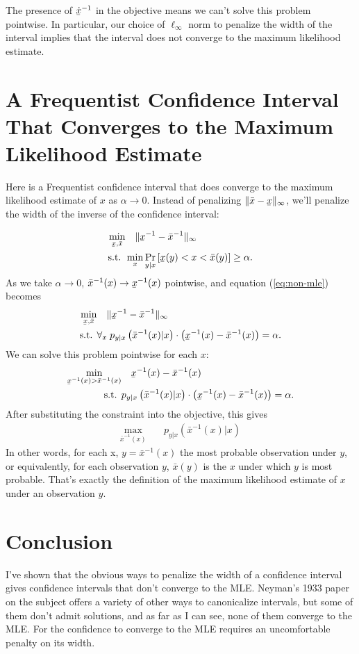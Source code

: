 \documentclass{article}
\newcommand{\xl}{\underaccent{\bar}{x}}
\newcommand{\xh}{\bar{x}}
\newcommand{\xli}{\xl^{-1}}
\newcommand{\xhi}{\xh^{-1}}
\newcommand{\1}{\mathbf{1}}
\begin{document}
The presence of $\dot{\xl}^{-1}$ in the objective means we can't solve this
problem pointwise. In particular, our choice of $\ell_\infty$ norm to penalize
the width of the interval implies that the interval does not converge to the
maximum likelihood estimate.

\section{A Frequentist Confidence Interval That Converges to the Maximum Likelihood Estimate}

Here is a Frequentist confidence interval that does converge to the maximum
likelihood estimate of $x$ as $\alpha\to 0$. Instead of penalizing
$\|\xh-\xl\|_\infty$, we'll penalize the width of the inverse of the confidence
interval:

\begin{align}
\min_{\xl, \xh} &\quad  \| \xl^{-1} - \xh^{-1} \|_\infty \\
\text{s.t. } & \min_x \Pr_{y|x}\left[\xl(y) < x < \xh(y) \right] \geq \alpha.
\end{align}
As we take $\alpha\to 0$, $\xh^{-1}(x) \to \xl^{-1}(x)$ pointwise, and equation (\ref{eq:non-mle}) becomes
\begin{align}
  \min_{\xl, \xh} &\quad  \| \xl^{-1} - \xh^{-1} \|_\infty \\
  \text{s.t. } & \forall_x\; p_{y|x}\left(\xh^{-1}(x) | x\right) \cdot \left(\xl^{-1}(x)-\xh^{-1}(x)\right) = \alpha.
\end{align}
We can solve this problem pointwise for each $x$:
\begin{align}
  \min_{\xli(x)> \xhi(x)} &\quad  \xli(x) - \xhi(x) \\
  \text{s.t. } &  p_{y|x}\left(\xhi(x) | x\right) \cdot \left(\xli(x)-\xhi(x)\right) = \alpha.
\end{align}
After substituting the constraint into the objective, this gives
\begin{align}
  \max_{\xhi(x)} &\quad  p_{y|x}\left(\xhi(x) | x\right) 
\end{align}
In other words, for each x, $y=\xhi(x)$ the most probable observation under
$y$, or equivalently, for each observation $y$, $\xh(y)$ is the $x$ under which
$y$ is most probable. That's exactly the definition of the maximum likelihood
estimate of $x$ under an observation $y$.
 
\section{Conclusion}

I've shown that the obvious ways to penalize the width of a confidence interval
gives confidence intervals that don't converge to the MLE. Neyman's 1933 paper
on the subject offers a variety of other ways to canonicalize intervals, but
some of them don't admit solutions, and as far as I can see, none of them
converge to the MLE. For the confidence to converge to the MLE requires an
uncomfortable penalty on its width.
\end{document}
